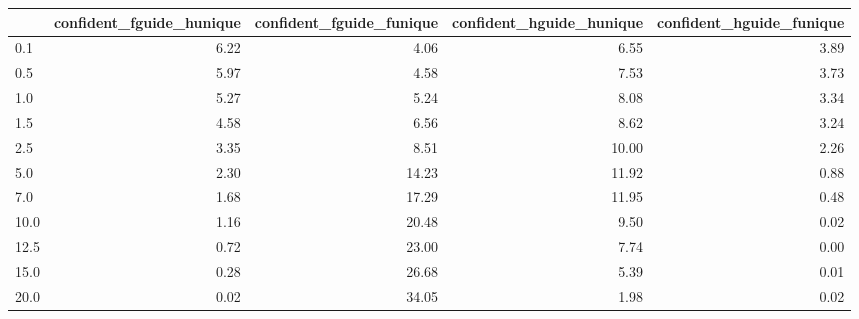 \begin{tabular}{lrrrr}
\toprule
 & confident_fguide_hunique & confident_fguide_funique & confident_hguide_hunique & confident_hguide_funique \\
\midrule
0.1 & 6.22 & 4.06 & 6.55 & 3.89 \\
0.5 & 5.97 & 4.58 & 7.53 & 3.73 \\
1.0 & 5.27 & 5.24 & 8.08 & 3.34 \\
1.5 & 4.58 & 6.56 & 8.62 & 3.24 \\
2.5 & 3.35 & 8.51 & 10.00 & 2.26 \\
5.0 & 2.30 & 14.23 & 11.92 & 0.88 \\
7.0 & 1.68 & 17.29 & 11.95 & 0.48 \\
10.0 & 1.16 & 20.48 & 9.50 & 0.02 \\
12.5 & 0.72 & 23.00 & 7.74 & 0.00 \\
15.0 & 0.28 & 26.68 & 5.39 & 0.01 \\
20.0 & 0.02 & 34.05 & 1.98 & 0.02 \\
\bottomrule
\end{tabular}
